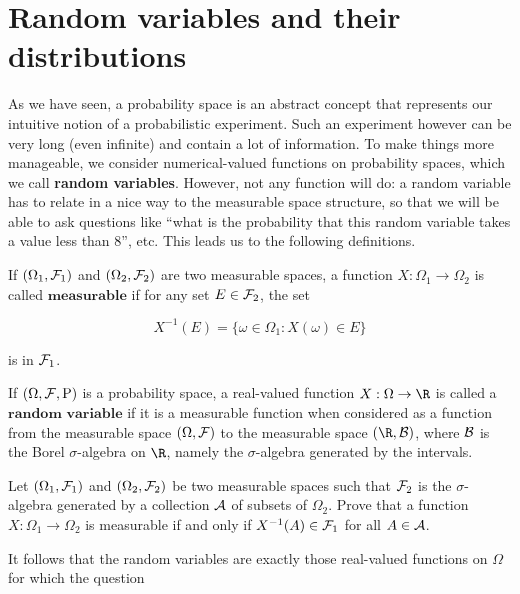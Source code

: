 \section{Random variables and their distributions}

As we have seen, a probability space is an abstract
concept that represents our intuitive notion of a
probabilistic experiment. Such an experiment however
can be very long (even infinite) and contain a lot of
information. To make things more manageable, we
consider numerical-valued functions on probability
spaces, which we call \textbf{random variables}.
However, not any function will do: a random variable
has to relate in a nice way to the measurable space
structure, so that we will be able to ask questions
like ``what is the probability that this random
variable takes a value less than 8'', etc. This leads
us to the following definitions.

\begin{defn}
If $(\Omega_1, {\cal F}_1)$ and
$(\Omega_2, {\cal F}_2)$ are two measurable spaces, a
function $X:\Omega_1\to \Omega_2$ is called
$\textbf{measurable}$ if for any set
$E \in {\cal F}_2$, the set

\[
X^{-1}(E) = \{ \omega \in \Omega_1 : X(\omega) \in E \}
\]

\noindent is in ${\cal F}_1$.
\end{defn}

\begin{defn}
If $(\Omega, {\cal F}, \mathrm{P})$ is a probability
space, a real-valued function $X:\Omega \to \R$ is
called a $\textbf{random variable}$ if it is a
measurable function when considered as a function from
the measurable space $(\Omega, {\cal F})$ to the
measurable space $(\R, {\cal B})$, where ${\cal B}$
is the Borel $\sigma$-algebra on $\R$, namely the
$\sigma$-algebra generated by the intervals.
\end{defn}

\begin{xexercise}
\label{ex-checkrv}
Let $(\Omega_1, {\cal F}_1)$ and
$(\Omega_2, {\cal F}_2)$ be two measurable spaces
such that ${\cal F}_2$ is the $\sigma$-algebra
generated by a collection ${\cal A}$ of subsets of
$\Omega_2$. Prove that a function
$X:\Omega_1 \to \Omega_2$ is measurable if and only
if $X^{-1}(A) \in {\cal F}_1$ for all
$A \in {\cal A}$.
\end{xexercise}

\noindent It follows that the random variables are exactly
those real-valued functions on $\Omega$ for which the
question

